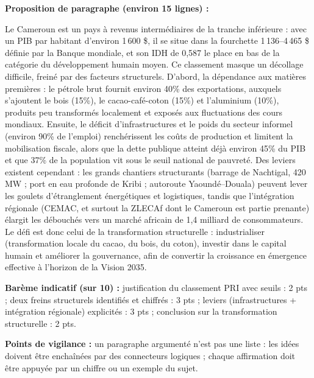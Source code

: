\documentclass[11pt]{article}
\begin{document}
\begin{corrige}
\textbf{Proposition de paragraphe (environ 15 lignes) :}

Le Cameroun est un pays à revenus intermédiaires de la tranche inférieure : avec un PIB par habitant d'environ 1\,600 \$, il se situe dans la fourchette 1\,136--4\,465 \$ définie par la Banque mondiale, et son IDH de 0,587 le place en bas de la catégorie du développement humain moyen. Ce classement masque un décollage difficile, freiné par des facteurs structurels. D'abord, la dépendance aux matières premières : le pétrole brut fournit environ 40\% des exportations, auxquels s'ajoutent le bois (15\%), le cacao-café-coton (15\%) et l'aluminium (10\%), produits peu transformés localement et exposés aux fluctuations des cours mondiaux. Ensuite, le déficit d'infrastructures et le poids du secteur informel (environ 90\% de l'emploi) renchérissent les coûts de production et limitent la mobilisation fiscale, alors que la dette publique atteint déjà environ 45\% du PIB et que 37\% de la population vit sous le seuil national de pauvreté. Des leviers existent cependant : les grands chantiers structurants (barrage de Nachtigal, 420 MW ; port en eau profonde de Kribi ; autoroute Yaoundé--Douala) peuvent lever les goulets d'étranglement énergétiques et logistiques, tandis que l'intégration régionale (CEMAC, et surtout la ZLECAf dont le Cameroun est partie prenante) élargit les débouchés vers un marché africain de 1,4 milliard de consommateurs. Le défi est donc celui de la transformation structurelle : industrialiser (transformation locale du cacao, du bois, du coton), investir dans le capital humain et améliorer la gouvernance, afin de convertir la croissance en émergence effective à l'horizon de la Vision 2035.

\textbf{Barème indicatif (sur 10) :} justification du classement PRI avec seuils : 2 pts ; deux freins structurels identifiés et chiffrés : 3 pts ; leviers (infrastructures + intégration régionale) explicités : 3 pts ; conclusion sur la transformation structurelle : 2 pts.

\textbf{Points de vigilance :} un paragraphe argumenté n'est pas une liste : les idées doivent être enchaînées par des connecteurs logiques ; chaque affirmation doit être appuyée par un chiffre ou un exemple du sujet.
\end{corrige}
\end{document}
